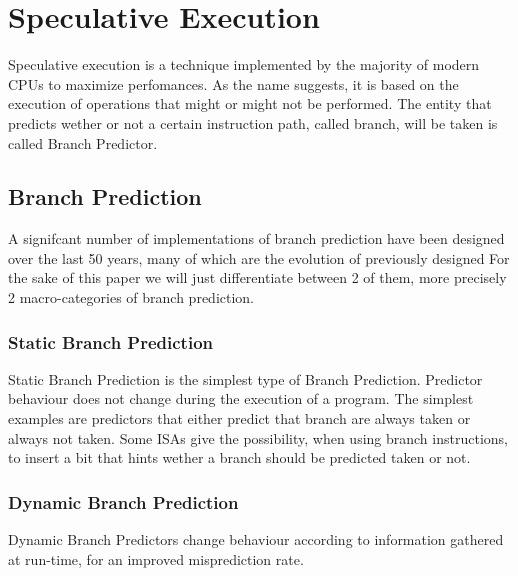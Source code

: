 \section{Speculative Execution}
Speculative execution is a technique implemented by the majority of modern CPUs to maximize perfomances. 
As the name suggests, it is based on the execution of operations that might or might not be performed. The entity that predicts wether or not a certain instruction path, called branch, will be taken is called Branch Predictor.

\subsection{Branch Prediction}
A signifcant number of implementations of branch prediction have been designed over the last 50 years, many of which are the evolution of previously designed 
For the sake of this paper we will just differentiate between 2 of them, more precisely 2 macro-categories of branch prediction.
\subsubsection{Static Branch Prediction}
Static Branch Prediction is the simplest type of Branch Prediction. Predictor behaviour does not change during the execution of a program. The simplest examples are predictors that either predict that branch are always taken or always not taken. Some ISAs give the possibility, when using branch instructions, to insert a bit that hints wether a branch should be predicted taken or not.
\subsubsection{Dynamic Branch Prediction}
Dynamic Branch Predictors change behaviour according to information gathered at run-time, for an improved misprediction rate. 

